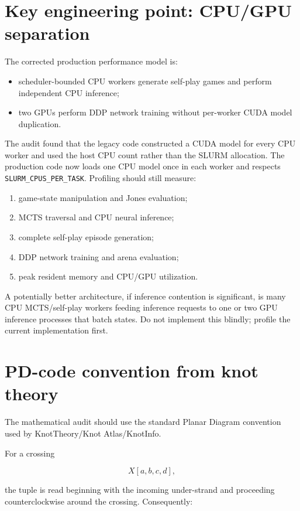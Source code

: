 \documentclass[11pt]{article}
\begin{document}
\section{Key engineering point: CPU/GPU separation}

The corrected production performance model is:

\begin{itemize}
    \item scheduler-bounded CPU workers generate self-play games and perform independent CPU inference;
    \item two GPUs perform DDP network training without per-worker CUDA model duplication.
\end{itemize}

The audit found that the legacy code constructed a CUDA model for every CPU worker and used the host CPU count rather than the SLURM allocation. The production code now loads one CPU model once in each worker and respects \texttt{SLURM\_CPUS\_PER\_TASK}. Profiling should still measure:

\begin{enumerate}[label=\arabic*.]
    \item game-state manipulation and Jones evaluation;
    \item MCTS traversal and CPU neural inference;
    \item complete self-play episode generation;
    \item DDP network training and arena evaluation;
    \item peak resident memory and CPU/GPU utilization.
\end{enumerate}

A potentially better architecture, if inference contention is significant, is many CPU MCTS/self-play workers feeding inference requests to one or two GPU inference processes that batch states. Do not implement this blindly; profile the current implementation first.

\section{PD-code convention from knot theory}

The mathematical audit should use the standard Planar Diagram convention used by KnotTheory/Knot Atlas/KnotInfo.

For a crossing

\[
X[a,b,c,d],
\]

the tuple is read beginning with the incoming under-strand and proceeding counterclockwise around the crossing. Consequently:
\end{document}
